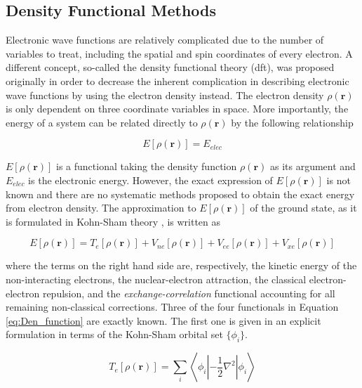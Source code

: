 \begin{refsection}
\subsection{Density Functional Methods}

Electronic wave functions are relatively complicated due to the number of variables to treat, including the spatial and spin coordinates of every electron. A different concept, so-called the density functional theory (\acrshort{dft}),\cite{c1:23:Kohn1996} was proposed originally in order to decrease the inherent complication in describing electronic wave functions by using the electron density instead. The electron density $\rho(\mathbf{r})$ is only dependent on three coordinate variables in space. More importantly, the energy of a system can be related directly to $\rho(\mathbf{r})$ \cite{c1:22:Hohenberg} by the following relationship

\begin{equation}
E[\rho(\mathbf{r})] = E_{elec}
\label{eq:DFT}
\end{equation}

\noindent $E[\rho(\mathbf{r})]$ is a functional taking the density function $\rho(\mathbf{r})$ as its argument and $E_{elec}$ is the electronic energy. However, the exact expression of $E[\rho(\mathbf{r})]$ is not known and there are no systematic methods proposed to obtain the exact energy from electron density. The approximation to $E[\rho(\mathbf{r})]$ of the ground state, as it is formulated in Kohn-Sham theory \cite{c1:23:kohn1965}, is written as

\begin{equation}
E[\rho(\mathbf{r})] = T_e[\rho(\mathbf{r})] + V_{ne}[\rho(\mathbf{r})] + V_{ee}[\rho(\mathbf{r})] + V_{xe}[\rho(\mathbf{r})]
\label{eq:Den_function}
\end{equation}

\noindent where the terms on the right hand side are, respectively, the kinetic energy of the non-interacting electrons, the nuclear-electron attraction, the classical el\-ec\-tron-e\-lectron repulsion, and the \emph{exchange-correlation} functional accounting for all remaining non-classical corrections. Three of the four functionals in Equation \ref{eq:Den_function} are exactly known. The first one is given in an explicit formulation in terms of the Kohn-Sham orbital set $\{\phi_i\}$.

\begin{equation}
T_e[\rho(\mathbf{r})] =  \sum_{i}^{}\left\langle\phi_i\left|-\frac{1}{2}\nabla^2\right|\phi_i\right\rangle
\label{eq:Den_kinetic_e}
\end{equation}


\end{refsection}
